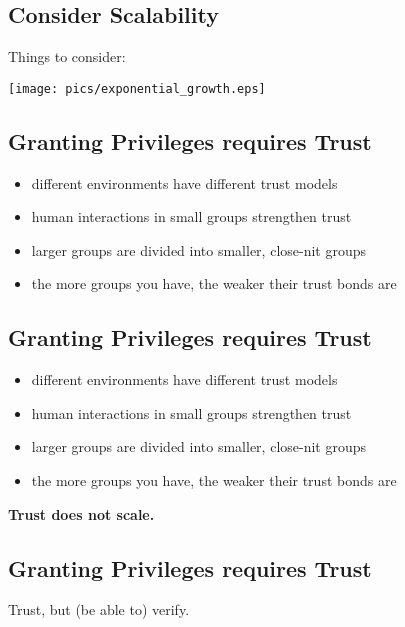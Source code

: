 \documentclass[xga]{xdvislides}
\begin{document}
\subsection{Consider Scalability}
Things to consider:
\\

\begin{center}
	\texttt{[image: pics/exponential\_growth.eps]}
\end{center}


\subsection{Granting Privileges requires Trust}
\begin{itemize}
	\item different environments have different trust models
	\item human interactions in small groups strengthen trust
	\item larger groups are divided into smaller, close-nit groups
	\item the more groups you have, the weaker their trust bonds are
\end{itemize}

\subsection{Granting Privileges requires Trust}
\begin{itemize}
	\item different environments have different trust models
	\item human interactions in small groups strengthen trust
	\item larger groups are divided into smaller, close-nit groups
	\item the more groups you have, the weaker their trust bonds are
\end{itemize}
\vspace{.5in}

\begin{center}
	\Huge
	{\bf Trust does not scale.}
	\Normalsize
\end{center}

\subsection{Granting Privileges requires Trust}
\vfill
\begin{center}
	\Huge
	Trust, but (be able to) verify.
	\Normalsize
\end{center}
\vfill
\end{document}
